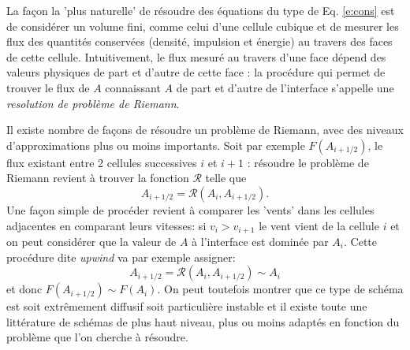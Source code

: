 La façon la 'plus naturelle' de résoudre des équations du type de Eq. \ref{e:cons} est de considérer un volume fini, comme celui d'une cellule cubique et de mesurer les flux des quantités conservées (densité, impulsion et énergie) au travers des faces de cette cellule. Intuitivement, le flux mesuré au travers d'une face dépend des valeurs physiques de part et d'autre de cette face : la procédure qui permet de trouver le flux de $A$ connaissant $A$ de part et d'autre de l'interface s'appelle une \textit{resolution de problème de Riemann}.

 Il existe nombre de façons de résoudre un problème de Riemann, avec des niveaux d'approximations plus ou moins importants. Soit par exemple $F(A_{i+1/2})$, le flux existant entre 2 cellules successives $i$ et $i+1$ : résoudre le problème de Riemann revient à trouver la fonction $\mathcal R$ telle que
 \begin{equation}
 A_{i+1/2}=\mathcal{R}(A_i, A_{i+1/2}).
 \end{equation}
 Une façon simple de procéder revient à comparer les 'vents' dans les cellules adjacentes en comparant leurs vitesses: si $v_i>v_{i+1}$ le vent vient de la cellule $i$ et on peut considérer que la valeur de $A$ à l'interface est dominée par $A_i$. Cette procédure dite \textit{upwind} va par exemple assigner:
  \begin{equation}
 A_{i+1/2}=\mathcal{R}(A_i, A_{i+1/2})\sim A_i
 \end{equation}
 et donc $F(A_{i+1/2})\sim F(A_{i})$. On peut toutefois montrer que ce type de schéma est soit extrêmement diffusif soit particulière instable et il existe toute une littérature de schémas de plus haut niveau, plus ou moins adaptés en fonction du problème que l'on cherche à résoudre.
 

